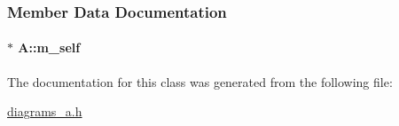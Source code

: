 \subsubsection{Member Data Documentation}
\paragraph[{\texorpdfstring{m\+\_\+self}{m_self}}]{$\ast$ A\+::m\+\_\+self}\hypertarget{class_a_a086d3a4efc697dba0601b9fef3d082ad}{}\label{class_a_a086d3a4efc697dba0601b9fef3d082ad}


The documentation for this class was generated from the following file\+:\begin{DoxyCompactItemize}
\item 
\hyperlink{diagrams__a_8h}{diagrams\+\_\+a.\+h}\end{DoxyCompactItemize}

